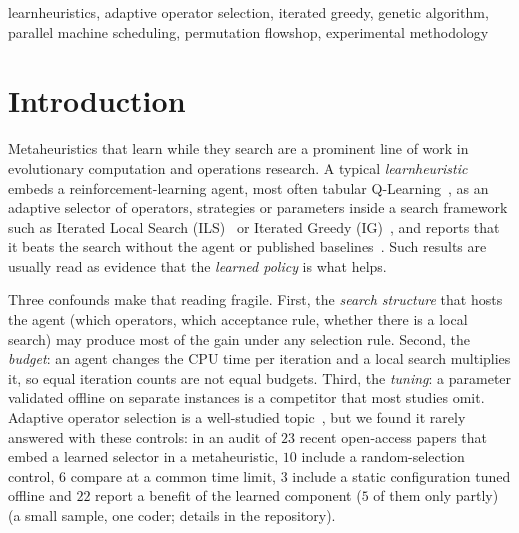 \documentclass[conference,a4paper]{IEEEtran}
\begin{document}
\begin{IEEEkeywords}
learnheuristics, adaptive operator selection, iterated greedy, genetic algorithm, parallel machine scheduling, permutation flowshop, experimental methodology
\end{IEEEkeywords}

\section{Introduction}
Metaheuristics that learn while they search are a prominent line of work in evolutionary computation and operations research. A typical \emph{learnheuristic}~\cite{CalvetEtal2017} embeds a
reinforcement-learning agent, most often tabular Q-Learning~\cite{WatkinsDayan1992,SuttonBarto2018}, as an adaptive selector of operators, strategies or parameters inside a search framework such as
Iterated Local Search (ILS)~\cite{LourencaoEtal2019} or Iterated Greedy (IG)~\cite{RuizStutzle2007}, and reports that it beats the search without the agent or published baselines~\cite{KarimiMamaghanEtal2023,MissaouiOSullivan2026}.
Such results are usually read as evidence that the \emph{learned policy} is what helps.

Three confounds make that reading fragile. First, the \emph{search structure} that hosts the agent (which operators, which acceptance rule, whether there is a local search) may produce most of the gain
under any selection rule. Second, the \emph{budget}: an agent changes the CPU time per iteration and a local search multiplies it, so equal iteration counts are not equal budgets. Third, the \emph{tuning}:
a parameter validated offline on separate instances is a competitor that most studies omit. Adaptive operator selection is a well-studied topic~\cite{FialhoEtal2010,PisingerRopke2007}, but we found it rarely
answered with these controls: in an audit of $23$ recent open-access papers that embed a learned selector in a metaheuristic, $10$ include a random-selection control, $6$ compare at a common time limit,
$3$ include a static configuration tuned offline and $22$ report a benefit of the learned component ($5$ of them only partly) (a small sample, one coder; details in the repository).
\end{document}
